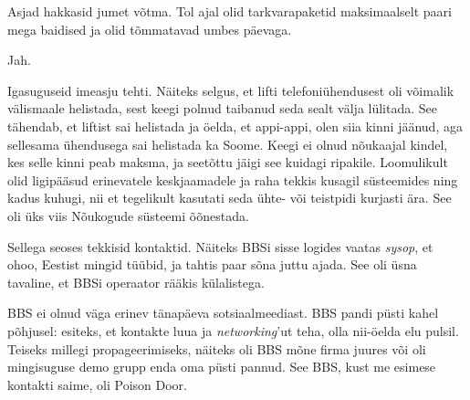 Asjad hakkasid jumet võtma. Tol ajal olid tarkvarapaketid maksimaalselt paari 
mega baidised ja olid tõmmatavad umbes päevaga.


Jah. 


Igasuguseid imeasju tehti. Näiteks selgus, et lifti 
telefoniühendusest oli võimalik välismaale helistada, sest keegi polnud taibanud 
seda sealt välja lülitada. See tähendab, et liftist sai helistada ja öelda, et 
appi-appi, olen siia kinni jäänud, aga sellesama ühendusega sai helistada ka Soome. Keegi ei olnud nõukaajal kindel, kes 
selle kinni peab maksma, ja seetõttu jäigi see kuidagi ripakile. 
Loomulikult olid ligipääsud erinevatele keskjaamadele ja raha 
tekkis kusagil süsteemides ning kadus kuhugi, nii et 
tegelikult kasutati seda ühte- või teistpidi kurjasti ära. See oli üks viis Nõukogude süsteemi õõnestada.

Sellega seoses tekkisid kontaktid. Näiteks BBSi sisse logides vaatas
\emph{sysop}, et ohoo, Eestist 
mingid tüübid, ja tahtis paar 
sõna juttu ajada. See oli üsna tavaline, et BBSi operaator rääkis külalistega.

BBS ei olnud väga erinev tänapäeva 
sotsiaalmeediast. BBS pandi püsti kahel põhjusel: esiteks, et kontakte luua ja
\emph{networking}'ut teha, olla nii-öelda elu pulsil. Teiseks millegi
propageerimiseks, näiteks oli BBS mõne firma juures või oli 
mingisuguse demo grupp enda oma püsti pannud. See BBS, kust me esimese 
kontakti saime, oli Poison Door.


